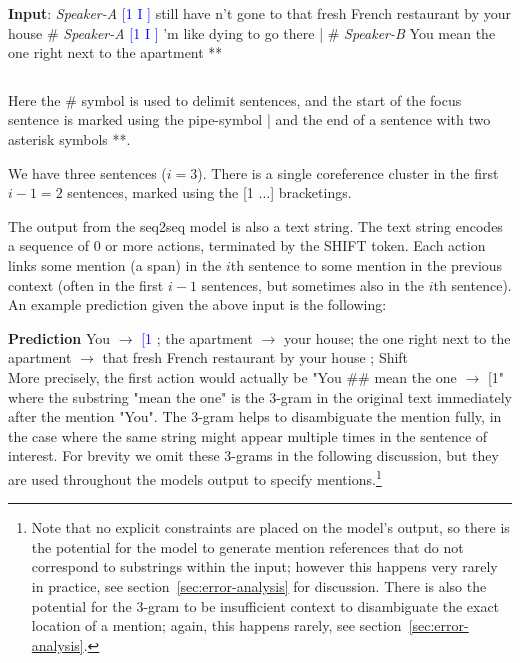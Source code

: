 \documentclass[11pt,a4paper]{article}
\begin{document}
\vspace{2ex}
\noindent
{\bf Input}:
{\it Speaker-A} \textcolor{blue}{[1 I ]} still have n't gone to that fresh French restaurant by your house \# {\it Speaker-A} \textcolor{blue}{[1 I ]} 'm like dying to go there | \# {\it Speaker-B} You mean the one right next to the apartment **

$\;$
\vspace{2ex}

Here the \# symbol is used to delimit sentences, and the start of the focus sentence is marked using the pipe-symbol | and the end of a sentence with two asterisk symbols **. 


We have three sentences ($i = 3$). There is a single coreference cluster in the first $i-1 = 2$ sentences, marked using the [1 $\ldots$] bracketings. 

The output from the seq2seq model is also a text string. The text string encodes a sequence of $0$ or more actions, terminated by the SHIFT token. Each action links some mention (a span) in the $i$th sentence to some mention in the previous context (often in the first $i-1$ sentences, but sometimes also in the $i$th sentence). An example prediction given the above input is the following:

\vspace{2ex}
\noindent
{\bf Prediction} You $\rightarrow$ \textcolor{blue}{[1} ; the apartment  $\rightarrow$ your house; the one right next to the apartment $\rightarrow$ that fresh French restaurant by your house ;    {\sc Shift}\\

\noindent
More precisely, the first action would actually be "You \#\# mean the one $\rightarrow$ [1" where the substring "mean the one" is the 3-gram in the original text immediately after the mention "You". The 3-gram helps to disambiguate the mention fully, in the case where the same string might appear multiple times in the sentence of interest. For brevity we omit these 3-grams in the following discussion, but they are used throughout the models output to specify mentions.\footnote{Note that no explicit constraints are placed on the model's output, so there is the potential for the model to generate mention references that do not correspond to substrings within the input; however this happens very rarely in practice, see section~\ref{sec:error-analysis} for discussion. There is also the potential for the 3-gram to be insufficient context to disambiguate the exact location of a mention; again, this happens rarely, see section~\ref{sec:error-analysis}.}
\end{document}
